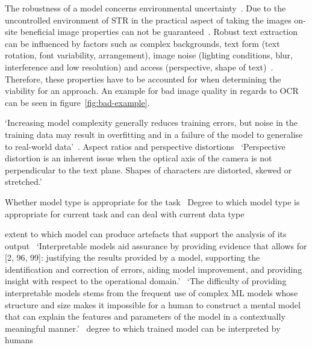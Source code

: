 The robustness of a model concerns environmental uncertainty~\cite{ashmore_assuring_2021}.
Due to the uncontrolled environment of \ac{STR} in the practical aspect of taking the images on-site
beneficial image properties can not be guaranteed~\citep{chen_text_2021}.
Robust text extraction can be influenced by factors such as complex backgrounds, text form
(text rotation, font variability, arrangement), image noise (lighting conditions, blur,
interference and low resolution) and access (perspective, shape of
text)~\citep{oyedotun_deep_2015,ghosh_visual_2017,chen_text_2021}.
Therefore, these properties have to be accounted for when determining the viability for an approach.
An example for bad image quality in regards to \ac{OCR} can be seen in figure~\ref{fig:bad-example}.


`Increasing model complexity generally reduces training errors, but noise in the training data may result in overfitting and in a failure of the model to generalise to real-world
data'~\citep{ashmore_assuring_2021}.
Aspect ratios and perspective distortions~\cite{sourvanos_challenges_2018}
`Perspective distortion is an inherent issue when the optical axis of the camera is not perpendicular to the text plane. Shapes of characters are distorted, skewed or stretched.'~\cite{sourvanos_challenges_2018}

Whether model type is appropriate for the task~\cite{nakamichi_requirements-driven_2020}
Degree to which model type is appropriate for current task and can deal with current data
type~\cite{siebert_construction_2021}

extent to which model can produce artefacts that support the analysis of its output~\citep{ashmore}
`Interpretable models aid assurance by providing evidence that allows for [2, 96, 99]: justifying the results provided by a model, supporting the identification and correction of errors, aiding model improvement, and providing insight with respect to the operational domain.'~\citep{ashmore_assuring_2021}
`The difficulty of providing interpretable models stems from the frequent use of complex ML models whose structure and size makes it impossible for a human to construct a mental model that can explain the features and parameters of the model in a contextually meaningful manner.'~\citep{ashmore_assuring_2021}
degree to which trained model can be interpreted by humans~\cite{siebert_construction_2021}

